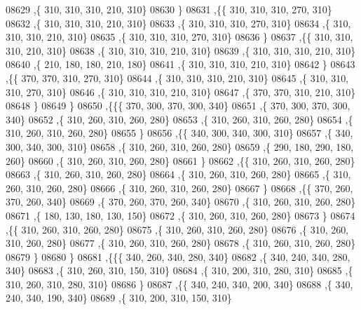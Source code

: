 \begin{DoxyCode}
08629     ,\{   310,   310,   310,   210,   310\}
08630     \}
08631    ,\{\{   310,   310,   310,   270,   310\}
08632     ,\{   310,   310,   310,   210,   310\}
08633     ,\{   310,   310,   310,   270,   310\}
08634     ,\{   310,   310,   310,   210,   310\}
08635     ,\{   310,   310,   310,   270,   310\}
08636     \}
08637    ,\{\{   310,   310,   310,   210,   310\}
08638     ,\{   310,   310,   310,   210,   310\}
08639     ,\{   310,   310,   310,   210,   310\}
08640     ,\{   210,   180,   180,   210,   180\}
08641     ,\{   310,   310,   310,   210,   310\}
08642     \}
08643    ,\{\{   370,   370,   310,   270,   310\}
08644     ,\{   310,   310,   310,   210,   310\}
08645     ,\{   310,   310,   310,   270,   310\}
08646     ,\{   310,   310,   310,   210,   310\}
08647     ,\{   370,   370,   310,   210,   310\}
08648     \}
08649    \}
08650   ,\{\{\{   370,   300,   370,   300,   340\}
08651     ,\{   370,   300,   370,   300,   340\}
08652     ,\{   310,   260,   310,   260,   280\}
08653     ,\{   310,   260,   310,   260,   280\}
08654     ,\{   310,   260,   310,   260,   280\}
08655     \}
08656    ,\{\{   340,   300,   340,   300,   310\}
08657     ,\{   340,   300,   340,   300,   310\}
08658     ,\{   310,   260,   310,   260,   280\}
08659     ,\{   290,   180,   290,   180,   260\}
08660     ,\{   310,   260,   310,   260,   280\}
08661     \}
08662    ,\{\{   310,   260,   310,   260,   280\}
08663     ,\{   310,   260,   310,   260,   280\}
08664     ,\{   310,   260,   310,   260,   280\}
08665     ,\{   310,   260,   310,   260,   280\}
08666     ,\{   310,   260,   310,   260,   280\}
08667     \}
08668    ,\{\{   370,   260,   370,   260,   340\}
08669     ,\{   370,   260,   370,   260,   340\}
08670     ,\{   310,   260,   310,   260,   280\}
08671     ,\{   180,   130,   180,   130,   150\}
08672     ,\{   310,   260,   310,   260,   280\}
08673     \}
08674    ,\{\{   310,   260,   310,   260,   280\}
08675     ,\{   310,   260,   310,   260,   280\}
08676     ,\{   310,   260,   310,   260,   280\}
08677     ,\{   310,   260,   310,   260,   280\}
08678     ,\{   310,   260,   310,   260,   280\}
08679     \}
08680    \}
08681   ,\{\{\{   340,   260,   340,   280,   340\}
08682     ,\{   340,   240,   340,   280,   340\}
08683     ,\{   310,   260,   310,   150,   310\}
08684     ,\{   310,   200,   310,   280,   310\}
08685     ,\{   310,   260,   310,   280,   310\}
08686     \}
08687    ,\{\{   340,   240,   340,   200,   340\}
08688     ,\{   340,   240,   340,   190,   340\}
08689     ,\{   310,   200,   310,   150,   310\}

\end{DoxyCode}
